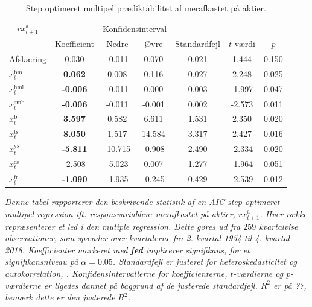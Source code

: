 \documentclass[
  a4paper,
  oneside]{memoir}
\begin{document}
\begin{table}[H]

\caption{\label{tab:MULT-step-ak}Step optimeret multipel prædiktabilitet af merafkastet på aktier.}
\centering
\begin{threeparttable}
\begin{tabular}[t]{lcccccc}
\toprule
\multicolumn{1}{c}{$rx_{t+1}^{\text{a}}$} & \multicolumn{1}{c}{ } & \multicolumn{2}{c}{Konfidensinterval} & \multicolumn{3}{c}{ } \\
\cmidrule(l{3pt}r{3pt}){1-1} \cmidrule(l{3pt}r{3pt}){3-4}
  & Koefficient & Nedre & Øvre & Standardfejl & $t$-værdi & $p$\\
\midrule
\rowcolor{gray!6}  Afskæring & 0.030 & -0.011 & 0.070 & 0.021 & 1.444 & 0.150\\
$x_t^{\text{bm}}$ & \textbf{ 0.062} & 0.008 & 0.116 & 0.027 & 2.248 & 0.025\\
\rowcolor{gray!6}  $x_t^{\text{hml}}$ & \textbf{-0.006} & -0.011 & 0.000 & 0.003 & -1.997 & 0.047\\
$x_t^{\text{smb}}$ & \textbf{-0.006} & -0.011 & -0.001 & 0.002 & -2.573 & 0.011\\
\rowcolor{gray!6}  $x_t^{\text{b}}$ & \textbf{ 3.597} & 0.582 & 6.611 & 1.531 & 2.350 & 0.020\\
$x_t^{\text{ts}}$ & \textbf{ 8.050} & 1.517 & 14.584 & 3.317 & 2.427 & 0.016\\
\rowcolor{gray!6}  $x_t^{\text{ys}}$ & \textbf{-5.811} & -10.715 & -0.908 & 2.490 & -2.334 & 0.020\\
$x_t^{\text{cs}}$ & -2.508 & -5.023 & 0.007 & 1.277 & -1.964 & 0.051\\
\rowcolor{gray!6}  $x_t^{\text{fr}}$ & \textbf{-1.090} & -1.935 & -0.245 & 0.429 & -2.539 & 0.012\\
\bottomrule
\end{tabular}
\begin{tablenotes}
\item \textit{Denne tabel rapporterer den beskrivende statistik af en AIC step optimeret multipel regression ift. responsvariablen: merafkastet på aktier, $rx_{t+1}^{\text{a}}$. Hver række repræsenterer et led i den mutiple regression. Dette gøres ud fra $259$ kvartalvise observationer, som spænder over kvartalerne fra 2. kvartal 1954 til 4. kvartal 2018. Koefficienter markeret med \textbf{fed} implicerer signifikans, for et signifikansniveau på $\alpha=0.05$. Standardfejl er justeret for heteroskedasticitet og autokorrelation, \citep{Newey1987}. Konfidensintervallerne for koefficienterne, $t$-værdierne og $p$-værdierne er ligedes dannet på baggrund af de justerede standardfejl. $R^2$ er på ??, bemærk dette er den justerede $R^2$.}
\end{tablenotes}
\end{threeparttable}
\end{table}
\end{document}
